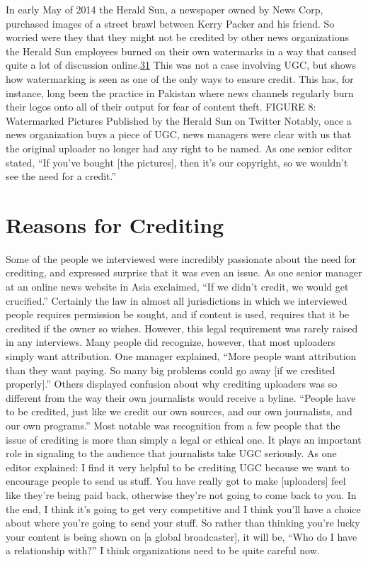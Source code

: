 \documentclass[symmetric, notoc, nobib]{towcenter-book}
\begin{document}
In early May of 2014 the Herald Sun, a newspaper owned by News Corp,
purchased images of a street brawl between Kerry Packer and his friend. So
worried were they that they might not be credited by other news organizations
the Herald Sun employees burned on their own watermarks in a way
that caused quite a lot of discussion online.{\href{#endnotes}{31}} This was not a case involving
UGC, but shows how watermarking is seen as one of the only ways
to ensure credit. This has, for instance, long been the practice in Pakistan
where news channels regularly burn their logos onto all of their output for
fear of content theft.
FIGURE 8: Watermarked Pictures Published by the Herald Sun on Twitter
Notably, once a news organization buys a piece of UGC, news managers
were clear with us that the original uploader no longer had any right to be
named. As one senior editor stated, ``If you've bought [the pictures], then it's
our copyright, so we wouldn't see the need for a credit.''

\section{Reasons for Crediting}
Some of the people we interviewed were incredibly passionate about the
need for crediting, and expressed surprise that it was even an issue. As one
senior manager at an online news website in Asia exclaimed, ``If we didn't
credit, we would get crucified.''
Certainly the law in almost all jurisdictions in which we interviewed people
requires permission be sought, and if content is used, requires that it be
credited if the owner so wishes. However, this legal requirement was rarely
raised in any interviews. Many people did recognize, however, that most
uploaders simply want attribution. One manager explained, ``More people
want attribution than they want paying. So many big problems could go
away [if we credited properly].''
Others displayed confusion about why crediting uploaders was so different
from the way their own journalists would receive a byline. ``People have to
be credited, just like we credit our own sources, and our own journalists,
and our own programs.''
Most notable was recognition from a few people that the issue of crediting
is more than simply a legal or ethical one. It plays an important role in
signaling to the audience that journalists take UGC seriously. As one editor
explained:
I find it very helpful to be crediting UGC because we want to encourage
people to send us stuff. You have really got to make [uploaders]
feel like they're being paid back, otherwise they're not going to come
back to you. In the end, I think it's going to get very competitive and I
think you'll have a choice about where you're going to send your stuff.
So rather than thinking you're lucky your content is being shown on
[a global broadcaster], it will be, ``Who do I have a relationship with?''
I think organizations need to be quite careful now.
\end{document}
